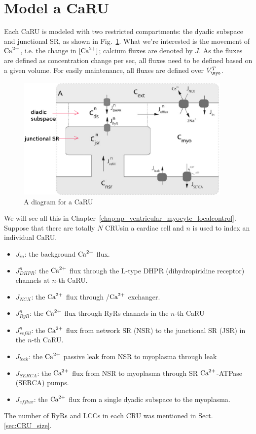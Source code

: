 \section{Model a CaRU}
\label{sec:model-caru-1}

Each CaRU is modeled with two restricted compartments: the dyadic
subspace and junctional SR, as shown in Fig.~\ref{fig:CaRU}.
What we're interested is the movement of ${\text{Ca}^{2+}}$, i.e. the change in $[{\text{Ca}^{2+}}]$;
calcium fluxes are denoted by $J$. As the fluxes are defined as concentration
change per sec, all fluxes need to be defined based on a given volume. For
easily maintenance, all fluxes are defined over $V_\myo^T$.
\begin{figure}[hbt]
  \centerline{\includegraphics[height=6cm]{./images/CaRU.eps}}
  \caption{A diagram for a CaRU}
  \label{fig:CaRU}
\end{figure}


We will see all this in Chapter~\ref{chap:ap_ventricular_myocyte_localcontrol}.
Suppose that there are totally $N$ CRUsin a cardiac cell and $n$ is
used to index an individual CaRU.
\begin{itemize}

\item $J_{in}$: the background ${\text{Ca}^{2+}}$ flux.

\item $J^n_{DHPR}$: the ${\text{Ca}^{2+}}$ flux through the L-type DHPR
  (dihydropiridine receptor) channels at $n$-th CaRU.

\item $J_{NCX}$: the  ${\text{Ca}^{2+}}$ flux through /${\text{Ca}^{2+}}$
  exchanger.

\item $J^n_{RyR}$: the  ${\text{Ca}^{2+}}$ flux through RyRs channels in the
  $n$-th CaRU

\item $J^n_{refill}$: the ${\text{Ca}^{2+}}$ flux from network SR (NSR) to the
  junctional SR (JSR) in the $n$-th CaRU.

\item $J_{leak}$: the ${\text{Ca}^{2+}}$ passive leak from NSR to myoplasma
  through leak

\item $J_{SERCA}$: the ${\text{Ca}^{2+}}$ flux from NSR to myoplasma through
  SR  ${\text{Ca}^{2+}}$-ATPase (SERCA) pumps.

\item $J_{efflux}$:  the ${\text{Ca}^{2+}}$ flux from a single dyadic subspace
  to the myoplasma.
\end{itemize}
The number of RyRs and LCCs in each CRU was mentioned in
Sect.\ref{sec:CRU_size}. 

